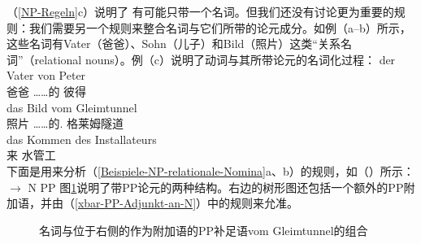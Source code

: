 （\ref{NP-Regeln}c）说明了 \nbarc 有可能只带一个名词。但我们还没有讨论更为重要的规则：我们需要另一个规则来整合名词与它们所带的论元成分。如例（a--b）所示，这些名词有Vater（爸爸）、Sohn（儿子）和Bild（照片）这类“关系名词”（relational nouns）。例（c）说明了动词与其所带论元的名词化过程：
\eal
\label{Beispiele-NP-relationale-Nomina}
\ex 
\gll der Vater von Peter\\
	  爸爸 ……的 彼得\\
\ex 
\gll das Bild vom Gleimtunnel\\
	  照片 ……的. 格莱姆隧道\\
\ex 
\gll das Kommen des Installateurs\\
	  来  水管工\\
\zl
\noindent
下面是用来分析（\ref{Beispiele-NP-relationale-Nomina}a、b）的规则，如（）所示：
\ea
\nbar $\to$ N PP
\z
%
图\ref{Abbildung-NP-mit-PP-Argument}说明了带PP论元的两种结构。右边的树形图还包括一个额外的PP附加语，并由（\ref{xbar-PP-Adjunkt-an-N}）中的规则来允准。
\begin{figure}
\caption{\label{Abbildung-NP-mit-PP-Argument}名词与位于右侧的作为附加语的PP补足语vom Gleimtunnel的组合}
\end{figure}%


